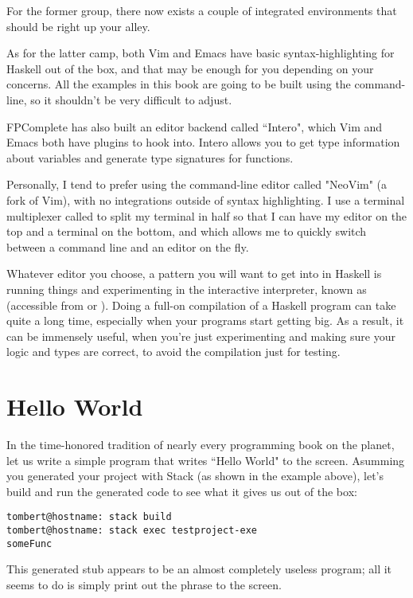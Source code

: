 For the former group, there now exists a couple of integrated environments that should be right up your alley. 

As for the latter camp, both Vim and Emacs have basic syntax-highlighting for Haskell out of the box, and that may be enough for you depending on your concerns.  All the examples in this book are going to be built using the command-line, so it shouldn't be very difficult to adjust. 

FPComplete has also built an editor backend called ``Intero", which Vim and Emacs both have plugins to hook into.  Intero allows you to get type information about variables and generate type signatures for functions. 

Personally, I tend to prefer using the command-line editor called "NeoVim" (a fork of Vim), with no integrations outside of syntax highlighting. I use a terminal multiplexer called  to split my terminal in half so that I can have my editor on the top and a terminal on the bottom, and which allows me to quickly switch between a command line and an editor on the fly.  

Whatever editor you choose, a pattern you will want to get into in Haskell is running things and experimenting in the interactive interpreter, known as  (accessible from  or ). Doing a full-on compilation of a Haskell program can take quite a long time, especially when your programs start getting big.  As a result, it can be immensely useful, when you're just experimenting and making sure your logic and types are correct, to avoid the compilation just for testing. 

\section{Hello World}

In the time-honored tradition of nearly every programming book on the planet, let us write a simple program that writes ``Hello World" to the screen.  Asumming you generated your project with Stack (as shown in the example above), let's build and run the generated code to see what it gives us out of the box:  

\begin{verbatim}
tombert@hostname: stack build
tombert@hostname: stack exec testproject-exe
someFunc 
\end{verbatim}

This generated stub appears to be an almost completely useless program; all it seems to do is simply print out the phrase  to the screen. 

